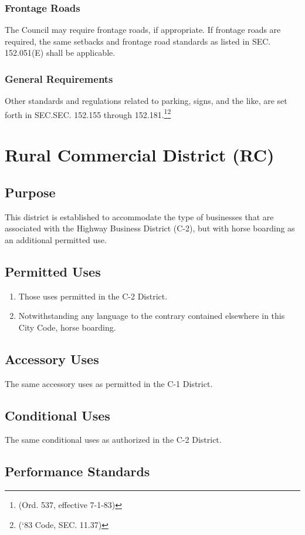 \subsubsection{Frontage Roads}
The Council may require frontage roads, if appropriate.  If frontage roads are required, the same setbacks and frontage road standards as listed in SEC. 152.051(E) shall be applicable.
\subsubsection{General Requirements}
Other standards and regulations related to parking, signs, and the like, are set forth in SEC.SEC. 152.155 through 152.181.\footnote{(Ord. 537, effective 7-1-83)}\footnote{(‘83 Code, SEC. 11.37)}

\setcounter{section}{53}
\section{Rural Commercial District (RC)}
\subsection{Purpose}
This district is established to accommodate the type of businesses that are associated with the Highway Business District (C-2), but with horse boarding as an additional permitted use.
\subsection{Permitted Uses}
\begin{enumerate}[{\indent}1)]
    \item Those uses permitted in the C-2 District.
    \item Notwithstanding any language to the contrary contained elsewhere in this City Code, horse boarding.
\end{enumerate}
\subsection{Accessory Uses}
The same accessory uses as permitted in the C-1 District.
\subsection{Conditional Uses}
The same conditional uses as authorized in the C-2 District.
\subsection{Performance Standards}
